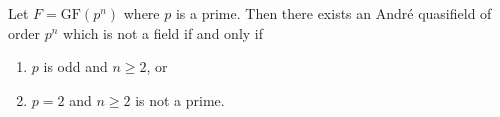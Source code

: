 Let $F = \mathrm{GF}(p^n)$ where $p$ is a prime. Then there exists an André quasifield of order $p^n$ which is not a field if and only if
\begin{enumerate}
\item[(a)] $p$ is odd and $n \geq 2$, or
\item[(b)] $p = 2$ and $n \geq 2$ is not a prime.
\end{enumerate}